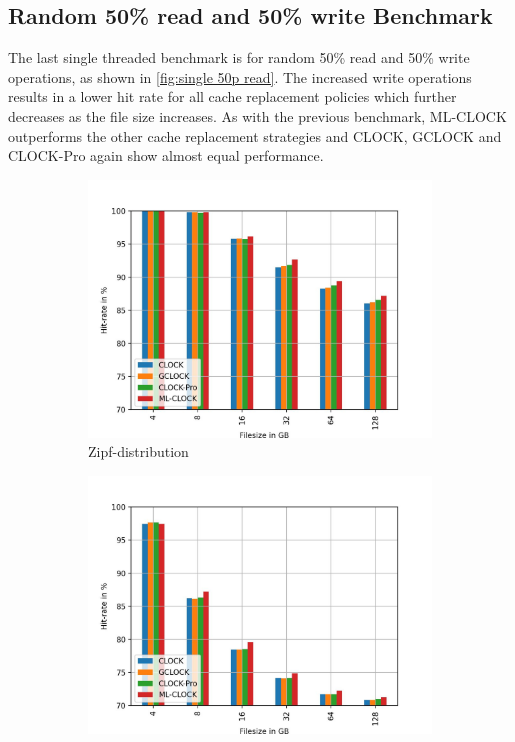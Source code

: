 \documentclass[
	12pt,
	a4paper,
	abstract,
	bibliography=totoc,
	chapterprefix,
	headings=openright,
	numbers=endperiod,
	parskip=half,
	twoside,
]{scrreprt}
\begin{document}
\newpage
\subsection{Random 50\% read and 50\% write Benchmark}

The last single threaded benchmark is for random 50\% read and 50\% write operations,
as shown in \cref{fig:single 50p read}.
The increased write operations results in a lower hit rate for all cache replacement policies which further 
decreases as the file size increases.
As with the previous benchmark, ML-CLOCK outperforms the other cache replacement strategies and
CLOCK, GCLOCK and CLOCK-Pro again show almost equal performance.


\begin{figure}[H]
	\centering
	\begin{subfigure}{0.4\textwidth}
		\includegraphics[width=\textwidth]{rw_50to50_zipf.jpg}		
		\caption{Zipf-distribution}
		\label{fig:rw_90to10  zipf}
	\end{subfigure}
	\hfill
	\begin{subfigure}{0.4\textwidth}
		\includegraphics[width=\textwidth]{rw_50to50_normal.jpg}		

\end{subfigure}
\end{figure}
\end{document}
